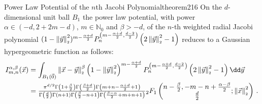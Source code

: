 \begin{theorem}{Power Law Potential of the $n$th Jacobi Polynomial}{theorem216}
  On the $d$-dimensional unit ball $B_1$ the power law potential, with power $\alpha \in(-d,2+2m-d)$, $m\in\mathbb{N}_0$ and $\beta>-d$, of the $n$-th weighted radial Jacobi polynomial $(1-\left\lVert\vec{y}\right\rVert_{\scriptscriptstyle 2}^2)^{m-\frac{\alpha+d}{2}}P_n^{\left(m-\frac{\alpha+d}{2},\frac{d-2}{2}\right)}\left(2 \left\lVert\vec{y}\right\rVert_{\scriptscriptstyle 2}^2 - 1\right)$ reduces to a Gaussian hypergeometric function as follows:
  \begin{align*}
    I_{m,n}^{\alpha,\beta}(\vec{x}) & = \int_{B_1(\vec{0})} \norm{\vec{x}-\vec{y}}^\beta \left(1-\norm{\vec{y}}^2\right)^{m-\frac{\alpha+d}{2}} P_{n}^{\left(m-\frac{\alpha+d}{2},\frac{d-2}{2}\right)}\left(\jacobiarg{y}\right) \dd\vec{y}                                                                                                                                                                                                             \\
                                    & = \tfrac{\pi ^{d/2} \Gamma \left(1+\frac{\beta}{2}\right) \Gamma \left(\frac{\beta+d}{2}\right) \Gamma \left(m+n-\frac{\alpha+d}{2}+1\right)}{\Gamma \left(\frac{d}{2}\right) \Gamma (n+1) \Gamma \left(\frac{\beta}{2}-n+1\right) \Gamma \left(\frac{\beta-\alpha}{2}+m+n+1\right)}{}_2F_1\left(\begin{matrix}n-\frac{\beta}{2}, -m-n+\frac{\alpha-\beta}{2} \\\frac{d}{2}\end{matrix};\norm{\vec{x}}^2\right)\,.
  \end{align*}
\end{theorem}

